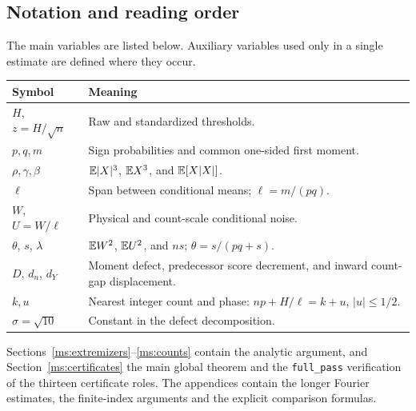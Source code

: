 \subsection{Notation and reading order}\label{ms:notation}
The main variables are listed below. Auxiliary variables used only in a
single estimate are defined where they occur.
\begin{center}\small
\begin{tabular}{@{}lP{110mm}@{}}\toprule
Symbol & Meaning\\\midrule
$H$, $z=H/\sqrt n$ & Raw and standardized thresholds.\\
$p,q,m$ & Sign probabilities and common one-sided first moment.\\
$\rho,\gamma,\beta$ & $\mathbb E|X|^3$, $\mathbb E X^3$, and $\mathbb E[X|X|]$.\\
$\ell$ & Span between conditional means; $\ell=m/(pq)$.\\
$W$, $U=W/\ell$ & Physical and count-scale conditional noise.\\
$\theta$, $s$, $\lambda$ & $\mathbb E W^2$, $\mathbb E U^2$, and $ns$; $\theta=s/(pq+s)$.\\
$D$, $d_n$, $d_Y$ & Moment defect, predecessor score decrement, and inward count-gap displacement.\\
$k,u$ & Nearest integer count and phase: $np+H/\ell=k+u$, $|u|\le1/2$.\\
$\sigma=\sqrt{10}$ & Constant in the defect decomposition.\\\bottomrule
\end{tabular}
\end{center}

Sections~\ref{ms:extremizers}--\ref{ms:counts} contain the analytic
argument, and Section~\ref{ms:certificates} the main global theorem
and the \texttt{full\_pass} verification of the thirteen certificate roles. The appendices contain the
longer Fourier estimates, the finite-index arguments and the explicit
comparison formulas.
